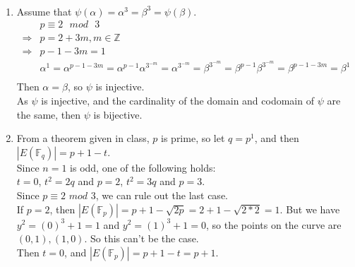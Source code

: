 \documentclass{assignment}
\begin{document}
\begin{problemlist}
\pbitem
\begin{problem}
\end{problem}
\begin{answer}
  \\
  \begin{enumerate}
  \item
    Assume that $\psi(\alpha)=\alpha^3=\beta^3=\psi(\beta)$.\\
    \begin{align*}
      &p \equiv 2 \text{ }mod\text{ } 3\\
      \Rightarrow& p=2+3m,m\in \mathbb{Z}\\
      \Rightarrow& p-1-3m=1\\
      &\alpha^1=\alpha^{p-1-3m}=\alpha^{p-1}\alpha^{3^{-m}}=\alpha^{3^{-m}}=\beta^{3^{-m}}=\beta^{p-1}\beta^{3^{-m}}=\beta^{p-1-3m}=\beta^1\\
    \end{align*}
    Then $\alpha=\beta$, so $\psi$ is injective.\\
    As $\psi$ is injective, and the cardinality of the domain and codomain of $\psi$ are the same, then $\psi$ is bijective.
  \item
    From a theorem given in class, $p$ is prime, so let $q=p^1$, and then $|E(\mathbb{F}_q)|=p+1-t$.\\
    Since $n=1$ is odd, one of the following holds:\\
    $t=0$, $t^2=2q$ and $p=2$, $t^2=3q$ and $p=3$.\\
    Since $p\equiv 2$ $mod$ $3$, we can rule out the last case.\\
    If $p=2$, then $|E(\mathbb{F}_p)|=p+1-\sqrt{2p}=2+1-\sqrt{2*2}=1$. But we have $y^2=(0)^3+1=1$ and $y^2=(1)^3+1=0$, so the points on the curve are $(0,1),(1,0)$. So this can't be the case.\\
    Then $t=0$, and $|E(\mathbb{F}_p)|=p+1-t=p+1$.\\
  \end{enumerate}
\end{answer}


\end{problemlist}
\end{document}
